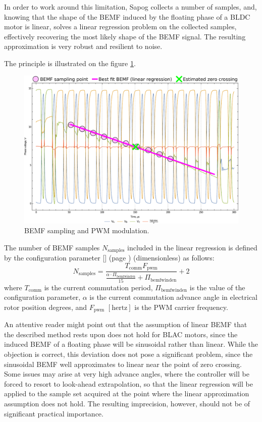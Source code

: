 \documentclass{zubaxdoc}
\newcommand{\CfgRef}[1]{
    \StrSubstitute{#1}{+}{\textunderscore}[\temp]
    \texttt{\temp} {\footnotesize (page \pageref{#1})}
    \listcsxadd{#1}{\thepage}   %
}
\begin{document}
In order to work around this limitation, Sapog collects a number of samples, and,
knowing that the shape of the BEMF induced by the floating phase of a BLDC motor is linear,
solves a linear regression problem on the collected samples, effectively recovering the most likely
shape of the BEMF signal.
The resulting approximation is very robust and resilient to noise.

The principle is illustrated on the figure \ref{phase_voltage_sampling}.

\begin{figure}[hbtp]
    \centering
	\includegraphics[width=\textwidth]{phase_voltage_sampling}
	\caption{BEMF sampling and PWM modulation.
	\label{phase_voltage_sampling}}
\end{figure}

The number of BEMF samples $N_\text{samples}$ included in the linear regression is defined by
the configuration parameter \CfgRef{mot+bemf+win+den} (dimensionless) as follows:
\begin{equation}
N_\text{samples} =
\frac{T_{\text{comm}} F_{\text{pwm}}}{\frac{\alpha\cdot{}\Pi_\text{bemfwinden}}{15} + \Pi_\text{bemfwinden}} + 2
\end{equation}
where $T_{\text{comm}}$ is the current commutation period,
$\Pi_\text{bemfwinden}$ is the value of the configuration parameter,
$\alpha$ is the current commutation advance angle in electrical rotor position degrees,
and $F_{\text{pwm}}$ $\left[\text{hertz}\right]$ is the PWM carrier frequency.

An attentive reader might point out that the assumption of linear BEMF that the described method rests
upon does not hold for BLAC motors, since the induced BEMF of a floating phase will be sinusoidal rather
than linear.
While the objection is correct, this deviation does not pose a significant problem, since the sinusoidal
BEMF well approximates to linear near the point of zero crossing.
Some issues may arise at very high advance angles, where the controller will be forced to resort to
look-ahead extrapolation, so that the linear regression will be applied to the sample set acquired
at the point where the linear approximation assumption does not hold.
The resulting imprecision, however, should not be of significant practical importance.
\end{document}
